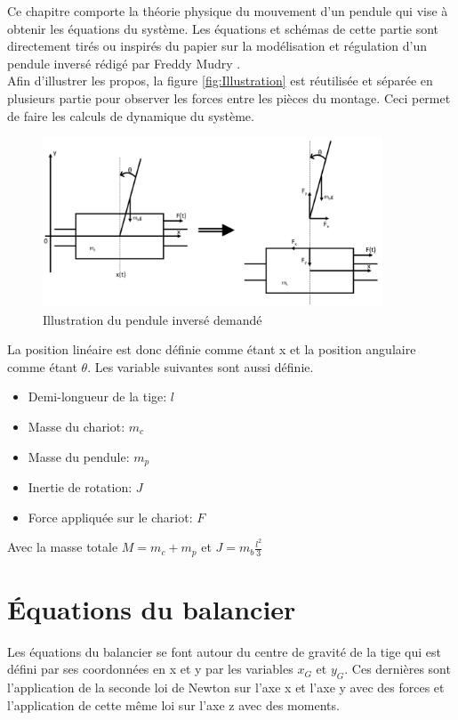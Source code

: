 Ce chapitre comporte la théorie physique du mouvement d'un pendule qui vise à obtenir les équations du système. Les équations et schémas de
cette partie sont directement tirés ou inspirés du papier sur la modélisation et régulation d'un pendule inversé rédigé par Freddy Mudry \cite{FreddyMudry}.\\

Afin d'illustrer les propos, la figure \ref{fig:Illustration} est réutilisée et séparée en plusieurs partie pour observer les forces entre
les pièces du montage. Ceci permet de faire les calculs de dynamique du système.

\begin{figure}[H]
    \centering
    \includegraphics[width = 0.9\textwidth]{assets/figures/SchemaPhysiquePendule.svg}
    \caption{Illustration du pendule inversé demandé}
    \label{fig:Illustration2}
\end{figure}

La position linéaire est donc définie comme étant x et la position angulaire comme étant $\theta$. Les variable suivantes sont aussi définie.

\begin{itemize}
    \item Demi-longueur de la tige: $l$
    \item Masse du chariot: $m_c$
    \item Masse du pendule: $m_p$
    \item Inertie de rotation: $J$
    \item Force appliquée sur le chariot: $F$
\end{itemize}

Avec la masse totale $M = m_c + m_p$ et $J = m_b\frac{l^2}{3}$

\section{Équations du balancier}\label{sec:EqBal}
Les équations du balancier se font autour du centre de gravité de la tige qui est défini par ses coordonnées en x et y par les variables $x_G$
et $y_G$. Ces dernières sont l'application de la seconde loi de Newton sur l'axe x et l'axe y avec des forces et l'application de cette même loi
sur l'axe z avec des moments.

